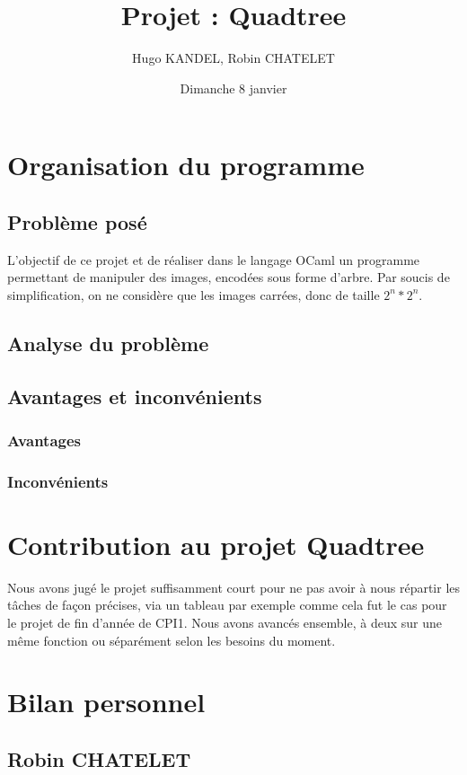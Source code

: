 \documentclass[12pt,a4paper]{article}
\title{Projet : Quadtree}
\author{Hugo KANDEL, Robin CHATELET}
\date{Dimanche 8 janvier}
\begin{document}
\maketitle
\pagebreak
\newpage
\tableofcontents
\pagebreak
\newpage

\section{Organisation du programme}
\subsection{Problème posé}
L'objectif de ce projet et de réaliser dans le langage OCaml un programme permettant de manipuler des images, encodées sous forme d’arbre. Par soucis de simplification, on ne considère que les images carrées, donc de taille $2^n * 2^n$.
\subsection{Analyse du problème} 

\subsection{Avantages et inconvénients}
\subsubsection{Avantages}

\subsubsection{Inconvénients}

\section{Contribution au projet Quadtree}
Nous avons jugé le projet suffisamment court pour ne pas avoir à nous répartir les tâches de façon précises, via un tableau par exemple comme cela fut le cas pour le projet de fin d'année de CPI1. Nous avons avancés ensemble, à deux sur une même fonction ou séparément selon les besoins du moment.
\section{Bilan personnel}
\subsection{Robin CHATELET}
\end{document}
